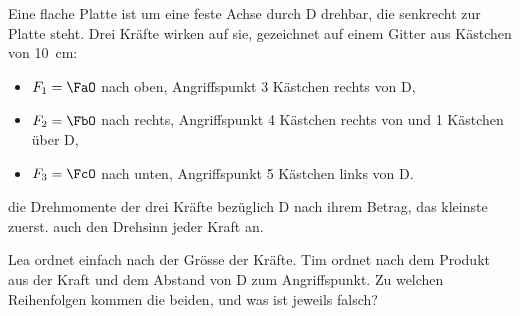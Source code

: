 Eine flache Platte ist um eine feste Achse durch D drehbar, die senkrecht zur Platte steht. Drei Kräfte wirken auf sie, gezeichnet auf einem Gitter aus Kästchen von \SI{10}{\cm}:
\begin{itemize}
 \item $F_1 = \FaO$ nach oben, Angriffspunkt 3 Kästchen rechts von D,
 \item $F_2 = \FbO$ nach rechts, Angriffspunkt 4 Kästchen rechts von und 1 Kästchen über D,
 \item $F_3 = \FcO$ nach unten, Angriffspunkt 5 Kästchen links von D.
\end{itemize}
\begin{center}
\end{center}

\begin{abcliste}
\abc
{} die Drehmomente der drei Kräfte bezüglich D nach ihrem Betrag, das kleinste zuerst.  auch den Drehsinn jeder Kraft an.

\abc
Lea ordnet einfach nach der Grösse der Kräfte. Tim ordnet nach dem Produkt aus der Kraft und dem Abstand von D zum Angriffspunkt. Zu welchen Reihenfolgen kommen die beiden, und was ist jeweils falsch?
\end{abcliste}
